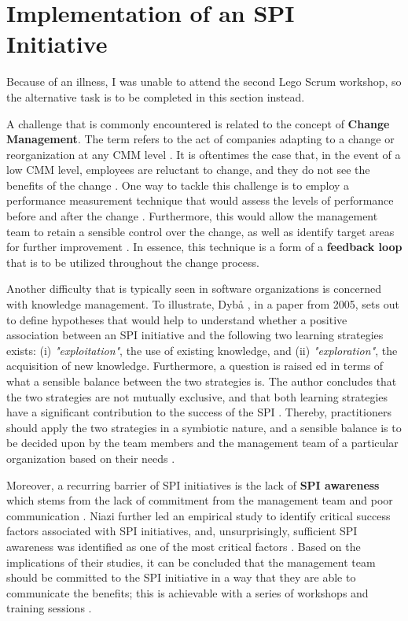 \documentclass[conference]{IEEEtran}
\begin{document}
\section{Implementation of an SPI Initiative}
\label{sec:implementation}

Because of an illness, I was unable to attend the second Lego Scrum workshop,
so the alternative task is to be completed in this section instead.

A challenge that is commonly encountered is related to the concept of
\textbf{Change Management}. The term refers to the act of companies adapting
to a change or reorganization at any CMM level \cite{Beecham2003}. It is
oftentimes the case that, in the event of a low CMM level, employees are
reluctant to change, and they do not see the benefits of the change
\cite{Beecham2003}. One way to tackle this challenge is to employ a performance
measurement technique that would assess the levels of performance before and
after the change \cite{Oakland2007}. Furthermore, this would allow the
management team to retain a sensible control over the change, as well as
identify target areas for further improvement \cite{Oakland2007}. In essence,
this technique is a form of a \textbf{feedback loop} that is to be utilized
throughout the change process.

Another difficulty that is typically seen in software organizations is concerned
with knowledge management. To illustrate, Dybå \cite{Dyba2005}, in a paper from
2005, sets out to define hypotheses that would help to understand whether
a positive association between an SPI initiative and the following two learning
strategies exists: (i) \textit{"exploitation"}, the use of existing knowledge,
and (ii) \textit{"exploration"}, the acquisition of new knowledge. Furthermore,
a question is raised ed in terms of what a sensible balance between the two
strategies is. The author concludes that the two strategies are not mutually
exclusive, and that both learning strategies have a significant contribution to
the success of the SPI \cite{Dyba2005}. Thereby, practitioners should apply the
two strategies in a symbiotic nature, and a sensible balance is to be decided
upon by the  team members and the management team of a particular organization
based on their needs \cite{Dyba2005}.

Moreover, a recurring barrier of SPI initiatives is the lack of \textbf{SPI
awareness} which stems from the lack of commitment from the management team
and poor communication \cite{Niazi2010}. Niazi further led an empirical study 
to identify critical success factors associated with SPI initiatives, and,
unsurprisingly, sufficient SPI awareness was identified as one of the most
critical factors \cite{Niazi2006}. Based on the implications of their studies,
it can be concluded that the management team should be committed to the SPI
initiative in a way that they are able to communicate the benefits; this is
achievable with a series of workshops and training sessions \cite{Niazi2006}.
\end{document}
